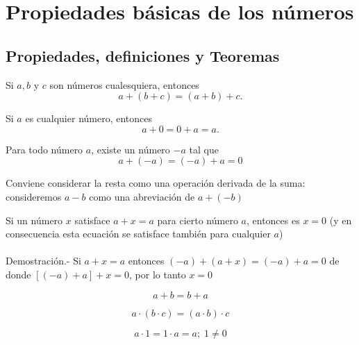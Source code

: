 \chapter{Propiedades básicas de los números}
\section{Propiedades, definiciones y Teoremas}
\begin{prop} Si $a,b$ y $c$ son números cualesquiera, entonces
$$a+(b+c) = (a+b)+c.$$
\end{prop}

\begin{prop} Si $a$ es cualquier número, entonces
$$a+0 = 0+a = a.$$
\end{prop}

\begin{prop} Para todo número $a$, existe un número $-a$ tal que
$$a+(-a) = (-a) + a = 0$$
\end{prop}

\begin{def.}
Conviene considerar la resta como una operación derivada de la suma: consideremos $a-b$ como una abreviación de $a+(-b)$\\
\end{def.}

\begin{teo}
Si un número $x$ satisface $a+x=a$ para cierto número $a$, entonces es $x=0$ (y en consecuencia esta ecuación se satisface también para cualquier $a$)\\\\
Demostración.- \; Si $a+x=a$ entonces $(-a)+(a+x)=(-a)+a=0$ de donde $\left[ (-a) + a \right] + x = 0$, por lo tanto $x=0$
\end{teo}


\begin{prop}
$$a+b = b+a$$
\end{prop}

\begin{prop}
$$a\cdot (b \cdot c) = (a \cdot b) \cdot c$$
\end{prop}

\begin{prop}
$$a \cdot 1 = 1 \cdot a = a; \; 1 \neq 0$$
\end{prop}

